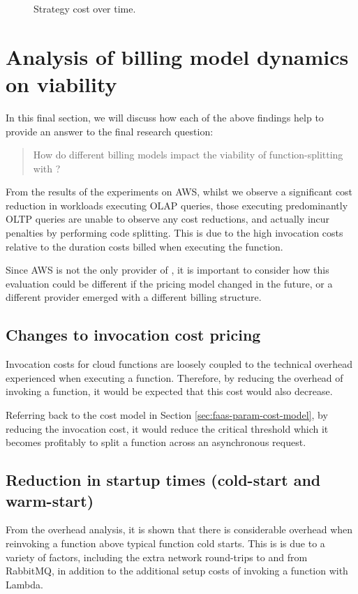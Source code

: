 \begin{figure*}
    \begin{center}
        
    \end{center}
    \caption{Strategy cost over time.}
    \label{fig:strategy-decision-over-time}
\end{figure*}

\section{Analysis of billing model dynamics on \faaas{} viability}
In this final section, we will discuss how each of the above findings help to provide an answer to the final research question: \blockquote{How do different \faas{} billing models impact the viability of function-splitting with \faaas{}?}.

From the results of the experiments on AWS, whilst we observe a significant cost reduction in workloads executing OLAP queries, those executing predominantly OLTP queries are unable to observe any cost reductions, and actually incur penalties by performing code splitting. This is due to the high invocation costs relative to the duration costs billed when executing the function.

Since AWS is not the only provider of \faas{}, it is important to consider how this evaluation could be different if the pricing model changed in the future, or a different provider emerged with a different billing structure.

\subsection{Changes to invocation cost pricing}
Invocation costs for cloud functions are loosely coupled to the technical overhead experienced when executing a \faas{} function. Therefore, by reducing the overhead of invoking a function, it would be expected that this cost would also decrease.

Referring back to the cost model in Section \ref{sec:faas-param-cost-model}, by reducing the invocation cost, it would reduce the critical threshold which it becomes profitably to split a function across an asynchronous request.

\subsection{Reduction in startup times (cold-start and warm-start)}
From the overhead analysis, it is shown that there is considerable overhead when reinvoking a function above typical function cold starts. This is is due to a variety of factors, including the extra network round-trips to and from RabbitMQ, in addition to the additional setup costs of invoking a function with Lambda.

